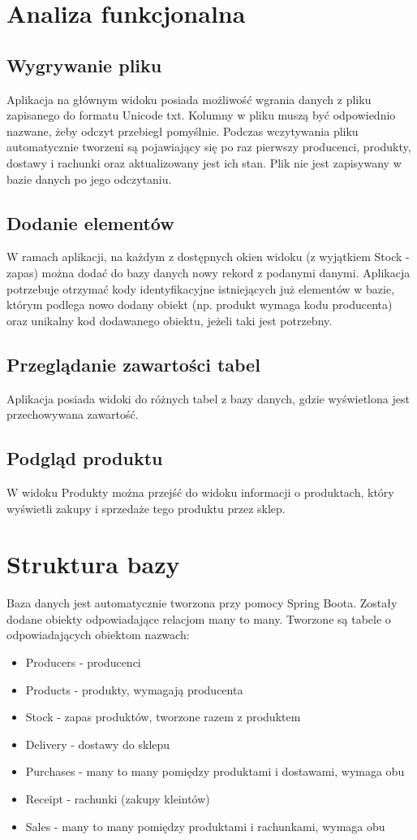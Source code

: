 \documentclass[a4paper,11pt]{article}
\begin{document}
\section{Analiza funkcjonalna}
\subsection{Wygrywanie pliku}
Aplikacja na głównym widoku posiada możliwość wgrania danych z pliku zapisanego do formatu Unicode txt.
Kolumny w pliku muszą być odpowiednio nazwane, żeby odczyt przebiegł pomyślnie.
Podczas wczytywania pliku automatycznie tworzeni są pojawiający się po raz pierwszy producenci, produkty,
dostawy i rachunki oraz aktualizowany jest ich stan. Plik nie jest zapisywany w bazie danych po jego odczytaniu.

\subsection{Dodanie elementów}
W ramach aplikacji, na każdym z dostępnych okien widoku (z wyjątkiem Stock - zapas) można dodać do bazy 
danych nowy rekord z podanymi danymi. Aplikacja potrzebuje otrzymać kody identyfikacyjne istniejących już 
elementów w bazie, którym podlega nowo dodany obiekt (np. produkt wymaga kodu producenta) oraz unikalny 
kod dodawanego obiektu, jeżeli taki jest potrzebny.
\subsection{Przeglądanie zawartości tabel}
Aplikacja posiada widoki do różnych tabel z bazy danych, gdzie wyświetlona jest przechowywana 
zawartość.

\subsection{Podgląd produktu}
W widoku Produkty można przejść do widoku informacji o produktach, który wyświetli zakupy i sprzedaże 
tego produktu przez sklep. 

\section{Struktura bazy}
Baza danych jest automatycznie tworzona przy pomocy Spring Boota. 
Zostały dodane obiekty odpowiadające relacjom many to many.
Tworzone są tabele o odpowiadających 
obiektom nazwach:
\begin{itemize}
    \item Producers - producenci
    \item Products - produkty, wymagają producenta
    \item Stock - zapas produktów, tworzone razem z produktem
    \item Delivery - dostawy do sklepu
    \item Purchases - many to many pomiędzy produktami i dostawami, wymaga obu
    \item Receipt - rachunki (zakupy kleintów)
    \item Sales - many to many pomiędzy produktami i rachunkami, wymaga obu
\end{itemize}
\end{document}

